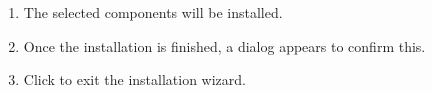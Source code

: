 \begin{enumerate}
\item The selected components will  be installed.
\item Once the installation is finished, a dialog appears to confirm this. 


\item Click  to exit the installation wizard.  

\end{enumerate}

